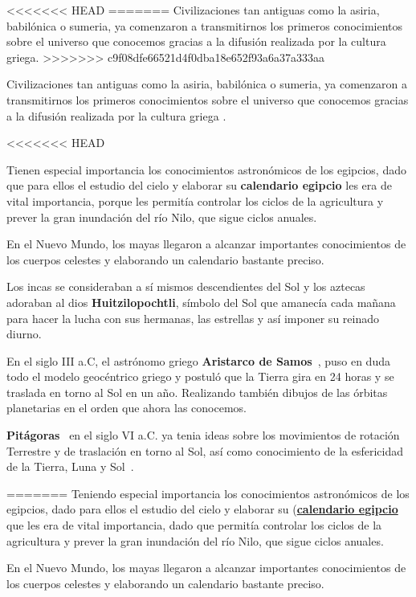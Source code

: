 <<<<<<< HEAD
=======
\bigskip
Civilizaciones tan antiguas como la asiria, babilónica o  sumeria, ya comenzaron a transmitirnos los primeros conocimientos sobre el universo que conocemos gracias a la difusión realizada por la cultura griega.
>>>>>>> c9f08dfe66521d4f0dba18e652f93a6a37a333aa

Civilizaciones tan antiguas como la asiria, babilónica o sumeria, ya comenzaron a transmitirnos los primeros conocimientos sobre el universo que conocemos gracias a la difusión realizada por la cultura griega \cite{historiaAstronomia}.

<<<<<<< HEAD

Tienen especial importancia los conocimientos astronómicos de los egipcios, dado que para ellos el estudio del cielo y elaborar su \textbf{calendario egipcio} \cite{calendario_egipcio} les era de vital importancia, porque les permitía controlar los ciclos de la agricultura y prever la gran inundación del río Nilo, que sigue ciclos anuales.


En el Nuevo Mundo, los mayas llegaron a alcanzar importantes conocimientos de los cuerpos celestes y elaborando un calendario bastante preciso. 


Los incas se consideraban a sí mismos descendientes del Sol y los aztecas adoraban al dios \textbf{Huitzilopochtli}, símbolo del Sol que amanecía cada mañana para hacer la lucha con sus hermanas, las estrellas y así imponer su reinado diurno.


En el  siglo III a.C, el astrónomo griego \textbf{Aristarco de Samos}~\cite{Arist}, puso en duda todo el modelo geocéntrico griego y postuló que la Tierra gira en 24 horas y se traslada en torno al Sol en un año. Realizando también dibujos de las órbitas planetarias en el orden que ahora las conocemos.


\textbf{Pitágoras}~\cite{Pitagoras} en el siglo VI  a.C. ya tenia ideas sobre los movimientos de rotación  Terrestre y de traslación en torno al Sol, así como conocimiento de la esfericidad de la Tierra, Luna y Sol~\cite{AstroAnti}.

=======
\bigskip
Teniendo especial importancia los conocimientos astronómicos de los egipcios, dado para ellos el estudio del cielo y elaborar su 
(\href{https://es.wikipedia.org/wiki/Calendario_egipcio}{\textbf{calendario egipcio}} que les era de vital importancia, dado que permitía controlar los ciclos de la agricultura y prever la gran inundación del río Nilo, que sigue ciclos anuales.

\bigskip
En el Nuevo Mundo, los mayas llegaron a alcanzar importantes conocimientos de los cuerpos celestes y elaborando un calendario bastante preciso. 
\newline

